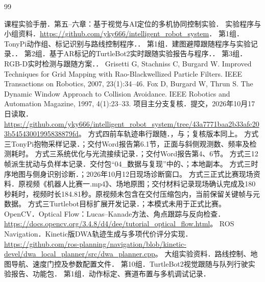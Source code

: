 \begin{thebibliography}{99}
 课程实验手册．第五--六章：基于视觉与AI定位的多机协同控制实验．
 实验程序与小组资料．\url{https://github.com/yky666/intelligent_robot_system}．
 第1组．TonyPi动作组、标记识别与路线控制程序．．
 第1组．建图避障跟随程序与实验记录．．
 第2组．基于AR标记的TurtleBot2实时跟随实验报告与程序．．
 第3组．RGB-D实时检测与跟随方案．．
 Grisetti G, Stachniss C, Burgard W. Improved Techniques for Grid Mapping with Rao-Blackwellized Particle Filters. IEEE Transactions on Robotics, 2007, 23(1):34--46.
 Fox D, Burgard W, Thrun S. The Dynamic Window Approach to Collision Avoidance. IEEE Robotics and Automation Magazine, 1997, 4(1):23--33.
 项目主分支复核．提交，2026年10月17日读取．\url{https://github.com/yky666/intelligent_robot_system/tree/43a7771baa2b33afc203b54543001995838879fd}。
 方式四前车轨迹串行跟随．，与；复核版本同上。
 方式三TonyPi抱物采样记录．；交付Word报告第6.1节，正面与斜侧观测数、频率及检测耗时。
 方式三系统优化与光流接续记录．；交付Word报告第4、6节。
 方式三12帧派生扰动与负样本记录．交付包“04\_数据与复现”中的、；本地副本。
 方式三时序地图与侧身识别诊断．；2026年10月12日现场诊断窗口。
 方式三正式比赛现场资料．原视频《机器人比赛一.mp4》、场地原图；交付材料记录现场确认完成及180秒耗时，视频时长184.81秒。原视频未包含在交付压缩包内，当前保留关键帧与元数据。
 方式三Turtlebot目标扩展开发记录．；本模式未用于正式比赛。
 OpenCV．Optical Flow：Lucas--Kanade方法、角点跟踪与反向检查．\url{https://docs.opencv.org/3.4.8/d4/dee/tutorial_optical_flow.html}。
 ROS Navigation．Kinetic版DWA轨迹生成与多项代价评分实现．\url{https://github.com/ros-planning/navigation/blob/kinetic-devel/dwa_local_planner/src/dwa_planner.cpp}。
 大组实验资料．路线控制、地图导航、速度门控及参数配置文件．
 第10组．TurtleBot2视觉跟随与队列行驶实验报告、功能包．
 第1组．动作标定、赛道布置与多机调试记录．
\end{thebibliography}
